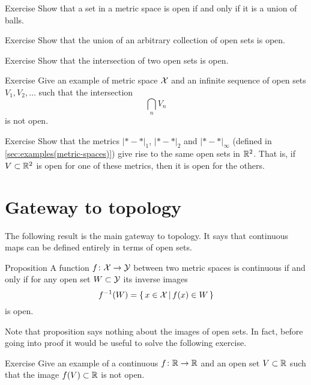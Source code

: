 \begin{thm}{Exercise}\label{ex:union-of-balls}
Show that a set in a metric space is open if and only if it is a union of balls. 
\end{thm}

\begin{thm}{Exercise}\label{ex:open-union} Show that the union of an arbitrary collection of open sets is open.
\end{thm}

\begin{thm}{Exercise}\label{ex:open-intersection}
Show that the intersection of two open sets is open.
\end{thm}

\begin{thm}{Exercise}
Give an example of metric space $\mathcal{X}$ and an infinite sequence of open sets $V_1,V_2,\dots$
such that the intersection
\[\bigcap_nV_n\]
is not open.
\end{thm}

\begin{thm}{Exercise}\label{ex:d1+d2+dinfty-open}
Show that the metrics $|{*}-{*}|_1$, $|{*}-{*}|_2$ and $|{*}-{*}|_\infty$ (defined in \ref{sec:examples(metric-spaces)})
give rise to the same open sets in $\mathbb{R}^2$.
That is, if $V\subset \mathbb{R}^2$ is open for one of these metrics, then it is open for the others.
\end{thm}

\section{Gateway to topology}

The following result is the main gateway to topology.
It says that continuous maps can be defined entirely in terms of open sets.

\begin{thm}{Proposition}\label{prop:cont-open}
A function $f\colon\mathcal{X}\to\mathcal{Y}$ 
between two metric spaces is continuous 
if and only if for any open set $W\subset\mathcal{Y}$ 
its inverse images
\[f^{-1}(W)=\left\{\,{x\in \mathcal{X}}\,\middle|\,{f(x)\in W}\,\right\}\]
is open.
\end{thm}

Note that proposition says nothing about the images of open sets. In fact, before going into proof it would be useful to solve the following exercise.

\begin{thm}{Exercise}\label{ex:image-of-open}
Give an example of a continuous $f\colon\mathbb{R}\to\mathbb{R}$ and an open set $V\subset \mathbb{R}$ such that the image $f(V)\subset \mathbb{R}$ is not open.
\end{thm}

